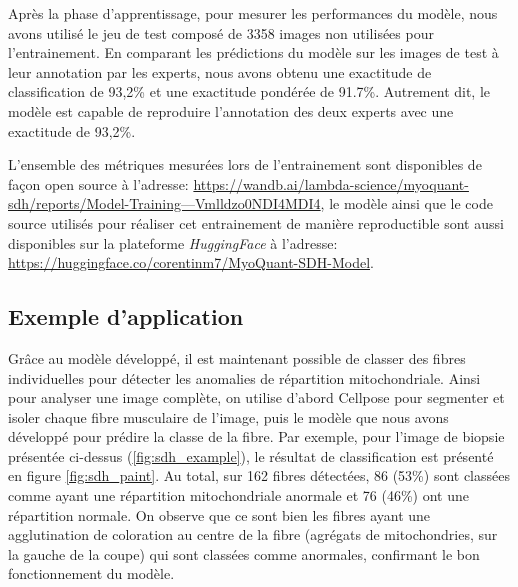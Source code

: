 Après la phase d'apprentissage, pour mesurer les performances du modèle, nous avons utilisé le jeu de test composé de 3358 images non utilisées pour l'entrainement. En comparant les prédictions du modèle sur les images de test à leur annotation par les experts, nous avons obtenu une exactitude de classification de 93,2\% et une exactitude pondérée de 91.7\%. Autrement dit, le modèle est capable de reproduire l'annotation des deux experts avec une exactitude de 93,2\%.

L'ensemble des métriques mesurées lors de l'entrainement sont disponibles de façon open source à l'adresse: \href{https://wandb.ai/lambda-science/myoquant-sdh/reports/Model-Training---Vmlldzo0NDI4MDI4}{https://wandb.ai/lambda-science/myoquant-sdh/reports/Model-Training---Vmlldzo0NDI4MDI4}, le modèle ainsi que le code source utilisés pour réaliser cet entrainement de manière reproductible sont aussi disponibles sur la plateforme \textit{HuggingFace} à l'adresse: \href{https://huggingface.co/corentinm7/MyoQuant-SDH-Model}{https://huggingface.co/corentinm7/MyoQuant-SDH-Model}.

\subsection{Exemple d'application}
Grâce au modèle développé, il est maintenant possible de classer des fibres individuelles pour détecter les anomalies de répartition mitochondriale. Ainsi pour analyser une image complète, on utilise d'abord Cellpose pour segmenter et isoler chaque fibre musculaire de l'image, puis le modèle que nous avons développé pour prédire la classe de la fibre. Par exemple, pour l'image de biopsie présentée ci-dessus (\ref{fig:sdh_example}), le résultat de classification est présenté en figure \ref{fig:sdh_paint}. Au total, sur 162 fibres détectées, 86 (53\%) sont classées comme ayant une répartition mitochondriale anormale et 76 (46\%) ont une répartition normale. On observe que ce sont bien les fibres ayant une agglutination de coloration au centre de la fibre (agrégats de mitochondries, sur la gauche de la coupe) qui sont classées comme anormales, confirmant le bon fonctionnement du modèle.

